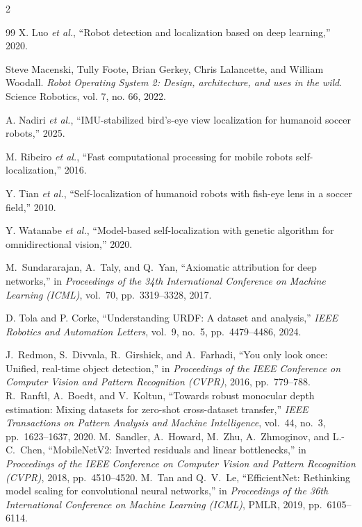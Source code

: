 \documentclass[a4paper]{article}
\begin{document}
\begin{multicols}{2}
\begin{thebibliography}{99}
X. Luo \textit{et al.}, ``Robot detection and localization based on deep learning,'' 2020.

Steve Macenski, Tully Foote, Brian Gerkey, Chris Lalancette, and William Woodall.
\textit{Robot Operating System 2: Design, architecture, and uses in the wild}. 
Science Robotics, vol. 7, no. 66, 2022. 

A. Nadiri \textit{et al.}, ``IMU-stabilized bird’s-eye view localization for humanoid soccer robots,'' 2025.

M. Ribeiro \textit{et al.}, ``Fast computational processing for mobile robots self-localization,'' 2016.

Y. Tian \textit{et al.}, ``Self-localization of humanoid robots with fish-eye lens in a soccer field,'' 2010.

Y. Watanabe \textit{et al.}, ``Model-based self-localization with genetic algorithm for omnidirectional vision,'' 2020.

M.~Sundararajan, A.~Taly, and Q.~Yan, ``Axiomatic attribution for deep networks,'' 
in \emph{Proceedings of the 34th International Conference on Machine Learning (ICML)}, 
vol.~70, pp.~3319--3328, 2017.

D. Tola and P. Corke, ``Understanding URDF: A dataset and analysis,'' \textit{IEEE Robotics and Automation Letters}, vol.~9, no.~5, pp.~4479--4486, 2024.

J.~Redmon, S.~Divvala, R.~Girshick, and A.~Farhadi, 
``You only look once: Unified, real-time object detection,'' 
in \textit{Proceedings of the IEEE Conference on Computer Vision and Pattern Recognition (CVPR)}, 
2016, pp.~779--788.
R.~Ranftl, A.~Boedt, and V.~Koltun, 
``Towards robust monocular depth estimation: Mixing datasets for zero-shot cross-dataset transfer,'' 
\textit{IEEE Transactions on Pattern Analysis and Machine Intelligence}, 
vol.~44, no.~3, pp.~1623--1637, 2020.
M.~Sandler, A.~Howard, M.~Zhu, A.~Zhmoginov, and L.-C.~Chen,
``MobileNetV2: Inverted residuals and linear bottlenecks,''
in \textit{Proceedings of the IEEE Conference on Computer Vision and Pattern Recognition (CVPR)},
2018, pp.~4510--4520.
M.~Tan and Q.~V.~Le,
``EfficientNet: Rethinking model scaling for convolutional neural networks,''
in \textit{Proceedings of the 36th International Conference on Machine Learning (ICML)},
PMLR, 2019, pp.~6105--6114.

\end{thebibliography}

\end{multicols}
\end{document}

